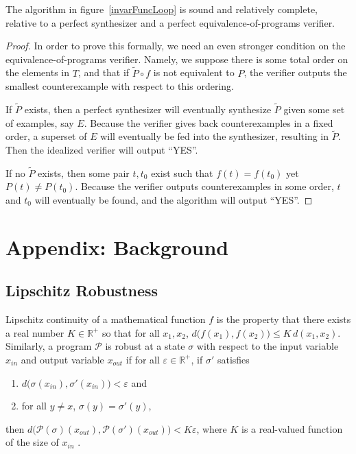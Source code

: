 \documentclass{llncs}
\begin{document}
  \begin{theorem}
    The algorithm in figure~\ref{invarFuncLoop} is sound and relatively complete,
    relative to a perfect synthesizer and a perfect equivalence-of-programs
    verifier.
  \end{theorem}
  \begin{proof}
    In order to prove this formally, we need an even stronger condition on the
    equivalence-of-programs verifier.
    Namely, we suppose there is some total order on the elements in $T$,
    and that if $\widetilde{P}\circ f$ is not equivalent to $P$,
    the verifier outputs the smallest counterexample with respect to this
    ordering.

    If $\widetilde{P}$ exists, then a perfect synthesizer will eventually
    synthesize $\widetilde{P}$ given some set of examples, say $E$.
    Because the verifier gives back counterexamples in a fixed order,
    a superset of $E$ will eventually be fed into the synthesizer,
    resulting in $\widetilde{P}$.
    Then the idealized verifier will output ``YES''.

    If no $\widetilde{P}$ exists, then some pair $t, t_0$ exist
    such that $f(t)=f(t_0)$ yet $P(t)\ne P(t_0)$.
    Because the verifier outputs counterexamples in some order,
    $t$ and $t_0$ will eventually be found, and the algorithm will output ``YES''.
  \end{proof}

\appendix

\section{Appendix: Background}

\subsection{Lipschitz Robustness}

Lipschitz continuity of a mathematical function \(f\) is the property that there
exists a real number \(K \in \mathbb{R}^{+}\) so that for all \(x_{1}, x_{2}\),
\(d\big(f(x_{1}), f(x_{2})\big) \leq K\,d(x_{1}, x_{2})\).  Similarly, a program
\(\mathcal{P}\) is robust at a state \(\sigma\)  with respect to the input
variable \(x_{in}\) and output variable \(x_{out}\) if for all \(\varepsilon \in
\mathbb{R}^{+}\), if \(\sigma'\) satisfies
\begin{enumerate}
    \item \(d\big(\sigma(x_{in}), \sigma'(x_{in})\big) < \varepsilon\) and
    \item for all \(y \not= x\), \(\sigma(y) = \sigma'(y)\),
\end{enumerate}
then \(d\big(\mathcal{P}(\sigma)(x_{out}), \mathcal{P}(\sigma')(x_{out})\big) <
K\varepsilon\), where \(K\) is a real-valued function of the size of \(x_{in}\)
\cite{chaudhuri11}.
\end{document}
